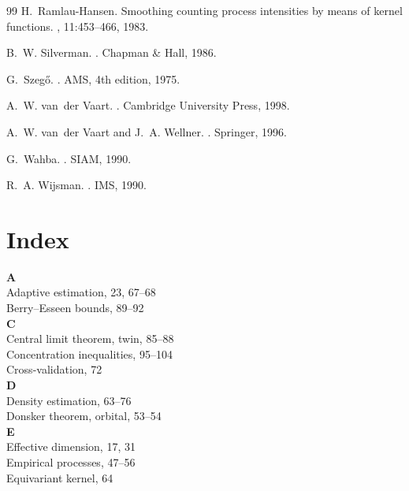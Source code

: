 \documentclass[11pt,twoside,openright]{book}
\theoremstyle{plain}
\theoremstyle{definition}
\theoremstyle{remark}
\begin{document}
\begin{thebibliography}{99}
H.~Ramlau-Hansen.
\newblock Smoothing counting process intensities by means of kernel functions.
, 11:453--466, 1983.

B.~W. Silverman.
.
\newblock Chapman \& Hall, 1986.

G.~Szeg\H{o}.
.
\newblock AMS, 4th edition, 1975.

A.~W. van~der Vaart.
.
\newblock Cambridge University Press, 1998.

A.~W. van~der Vaart and J.~A. Wellner.
.
\newblock Springer, 1996.

G.~Wahba.
.
\newblock SIAM, 1990.

R.~A. Wijsman.
.
\newblock IMS, 1990.

\end{thebibliography}


\chapter{Index}

\textbf{A}\\
Adaptive estimation, 23, 67--68\\
Berry--Esseen bounds, 89--92\\

\textbf{C}\\
Central limit theorem, twin, 85--88\\
Concentration inequalities, 95--104\\
Cross-validation, 72\\

\textbf{D}\\
Density estimation, 63--76\\
Donsker theorem, orbital, 53--54\\

\textbf{E}\\
Effective dimension, 17, 31\\
Empirical processes, 47--56\\
Equivariant kernel, 64\\
\end{document}
